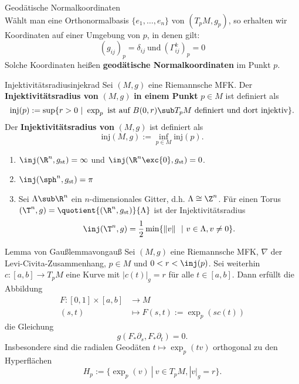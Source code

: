 \begin{bemerkung}Geodätische Normalkoordinaten\\
Wählt man eine Orthonormalbasis $\{ e_1, \dots, e_n \}$ von $(T_pM, g_p)$, so erhalten wir Koordinaten auf einer Umgebung von $p$, in denen gilt:
\begin{equation}
(g_{ij})_p = \delta_{ij} \ \text{und} \ ( \Gamma_{ij}^k)_p = 0
\end{equation}
Solche Koordinaten heißen \textbf{geodätische Normalkoordinaten} im Punkt $p$.
\end{bemerkung}
\begin{definition}{Injektivitätsradius}{injekrad}
Sei $(M,g)$ eine Riemannsche MFK. Der \textbf{Injektivitätsradius von} $(M,g)$ \textbf{in einem Punkt} $p\in M$ ist definiert als
\begin{equation}
\text{inj}(p) := \sup \{ r > 0 \ | \ \exp_p \ \text{ist auf} \ B(0,r) \sub T_pM \ \text{definiert und dort injektiv} \}.
\end{equation} 
Der \textbf{Injektivitätsradius von} $(M,g)$ ist definiert als 
\begin{equation}
\text{inj}(M,g) := \inf_{p \in M} \text{inj}(p).
\end{equation}
\end{definition}
\begin{beispiele}
\begin{enumerate}
\item $\inj (\R^n, g_\text{st}) = \infty$ und $\inj (\R^n \exc \{0\}, g_\text{st}) = 0$.
\item $\inj (\sph^n, g_\text{st}) = \pi$
\item Sei $\Lambda \sub \R^n$ ein $n$-dimensionales Gitter, d.h. $\Lambda \cong \Z^n$. Für einen Torus $(\T^n,g) = \quotient{(\R^n, g_\text{st})}{\Lambda}$ ist der Injektivitätsradius
\begin{equation}
\inj (\T^n, g) = \frac{1}{2} \min \{ \| v \|\ \ | \ v \in \Lambda, v \neq 0 \}.
\end{equation}
\end{enumerate}
\end{beispiele}
\begin{satz}{Lemma von Gauß}{lemmavongauß}
Sei $(M,g)$ eine Riemannsche MFK, $\nabla$ der Levi-Civita-Zusammenhang, $p \in M$ und $0 < r < \inj (p)$. Sei weiterhin $c: [a,b] \to T_pM$ eine Kurve mit $|c(t)|_g = r$ für alle $t \in [a,b]$. Dann erfüllt die Abbildung
\begin{align}
F: [0,1] \times [a,b] &\to M\\
(s,t) &\mapsto F(s,t):=\exp_p (s c(t))
\end{align}
die Gleichung
\begin{equation}
g(F_\ast \partial_s, F_\ast \partial_t) = 0.
\end{equation}
Insbesondere sind die radialen Geodäten $t \mapsto \exp_p (tv)$ orthogonal zu den Hyperflächen
\begin{equation}
H_p := \{ \exp_p (v) \ | \ v \in T_pM, |v|_g = r \}.
\end{equation}
\end{satz}
